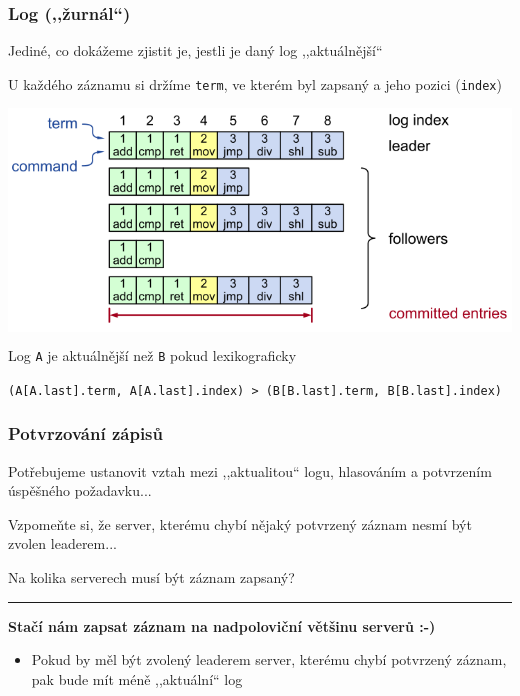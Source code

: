 \documentclass[usenames,dvipsnames,9pt]{beamer}
\begin{document}
\begin{frame}[fragile]
  \frametitle{Log (,,žurnál``)}

  {\large Jediné, co dokážeme zjistit je, jestli je daný log ,,aktuálnější``}

  \hfill
  \begin{minipage}{0.53\linewidth}
    U každého záznamu si držíme \texttt{term}, ve kterém byl zapsaný a jeho pozici (\texttt{index})
  \end{minipage}

  \begin{center}
	  \colorbox{white}{\includegraphics[width=0.7\linewidth]{12/figs/log.png}}
  \end{center}

  \pause\vspace{1em}
  Log \texttt{A} je aktuálnější než \texttt{B} pokud lexikograficky
  \begin{center}
    \footnotesize\texttt{(A[A.last].term, A[A.last].index) > (B[B.last].term, B[B.last].index)}
  \end{center}
\end{frame}

\begin{frame}
  \frametitle{Potvrzování zápisů}

  {\large Potřebujeme ustanovit vztah mezi ,,aktualitou`` logu, hlasováním a potvrzením úspěšného požadavku...}

  Vzpomeňte si, že server, kterému chybí nějaký potvrzený záznam nesmí být zvolen leaderem...

  \begin{center}
    \LARGE Na kolika serverech musí být záznam zapsaný?
  \end{center}

  \pause\vspace{2em}\hrule\vspace{2em}

  {\bf \faWarning \hspace{3pt} Stačí nám zapsat záznam na nadpoloviční většinu serverů :-)}
  \begin{itemize}
    \item Pokud by měl být zvolený leaderem server, kterému chybí potvrzený záznam, pak bude mít méně ,,aktuální`` log
  \end{itemize}
\end{frame}
\end{document}
